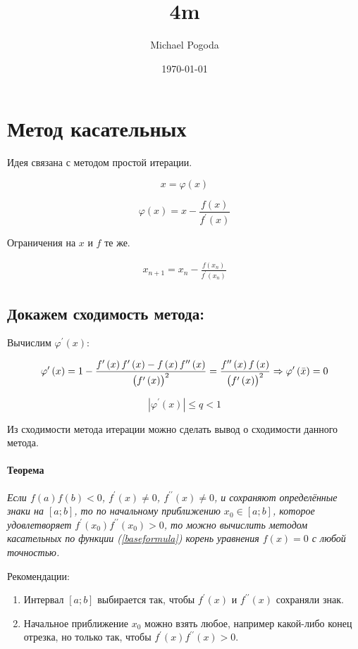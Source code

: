 \documentclass[a4paper,10pt,notitlepage,pdftex,headsepline]{scrartcl}
\author{Michael Pogoda}
\title{4m}
\date{\today}
\begin{document}
\section*{Метод касательных}
Идея связана с методом простой итерации.

$$x = \varphi \left( x\right)$$

$$\varphi\left(x\right) = x - \frac{f\left(x\right)}{f^\prime\left(x\right)}$$

Ограничения на $x$ и $f$ те же.

\begin{align}
 & x_{n+1} = x_n - \frac{f\left(x_n\right)}{f^\prime\left(x_n\right)} & \label{baseformula}
\end{align}

\subsection*{Докажем сходимость метода:}
Вычислим $\varphi^\prime\left(x\right)$:

$$\varphi^\prime\left(x\right) = 1- \frac{f^\prime\left(x\right)f^\prime\left(x\right) - f\left(x\right)f^{\prime\prime}\left(x\right)}{\left(\strut f^\prime\left(x\right)\right)^2} = \frac{f^{\prime\prime}\left(x\right) f \left( x \right)}{\left(\strut f^\prime \left( x \right) \right)^2}
\Rightarrow \varphi^\prime\left(\bar{x}\right) = 0$$

$$\left|\varphi^\prime\left(x\right)\right| \leqslant q < 1$$

Из сходимости метода итерации можно сделать вывод о сходимости данного метода.
\paragraph*{Теорема}
\textit{Если $f\left(a\right) f\left(b\right) < 0$, $f^\prime\left(x\right) \neq 0$, $f^{\prime\prime}\left(x\right) \neq 0$, и сохраняют определённые знаки на $\left[a; b\right]$, то по начальному приближению $x_0 \in \left[a;b\right]$, которое удовлетворяет $f^\prime\left(x_0\right) f^{\prime\prime}\left(x_0\right) > 0$, то можно вычислить методом касательных по функции (\ref{baseformula}) корень уравнения $f\left(x\right) = 0$ с любой точностью.}

Рекомендации:
\begin{enumerate}
\item Интервал $\left[a;b\right]$ выбирается так, чтобы $f^\prime\left(x\right)$ и $f^{\prime\prime}\left(x\right)$ сохраняли знак.
\item Начальное приближение $x_0$ можно взять любое, например какой-либо конец отрезка, но только так, чтобы $f^\prime\left(x\right) f^{\prime\prime}\left(x\right) > 0$.
\end{enumerate}
\end{document}
